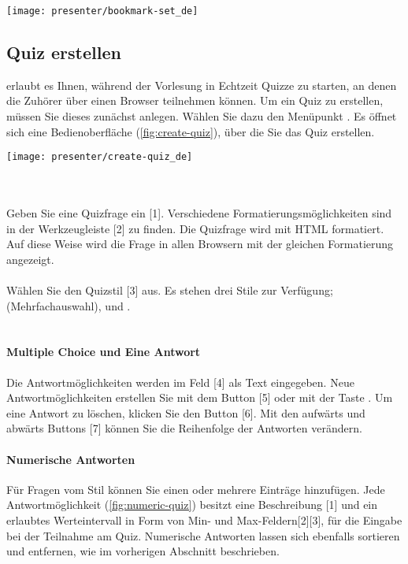 \begin{minipage}{0.9\textwidth}
	\centering
	\captionsetup{type=figure}
	\texttt{[image: presenter/bookmark-set\_de]}
  	\label{fig:bookmark-set}
\end{minipage}


\subsection{Quiz erstellen}
\label{section:create-quiz}
\lectPresenter{} erlaubt es Ihnen, während der Vorlesung in Echtzeit Quizze zu starten, an denen die Zuhörer über einen Browser teilnehmen können. Um ein Quiz zu erstellen, müssen Sie dieses zunächst anlegen. Wählen Sie dazu den Menüpunkt . Es öffnet sich eine Bedienoberfläche (\autoref{fig:create-quiz}), über die Sie das Quiz erstellen.

\begin{minipage}{0.9\textwidth}
	\centering
	\captionsetup{type=figure}
	\texttt{[image: presenter/create-quiz\_de]}
  	\label{fig:create-quiz}
\end{minipage}
\\\\
Geben Sie eine Quizfrage ein [1]. Verschiedene Formatierungsmöglichkeiten sind in der Werkzeugleiste [2] zu finden. Die Quizfrage wird mit HTML formatiert. Auf diese Weise wird die Frage in allen Browsern mit der gleichen Formatierung angezeigt.
\\\\
Wählen Sie den Quizstil [3] aus. Es stehen drei Stile zur Verfügung;  (Mehrfachauswahl),  und .
\\\\
\paragraph{Multiple Choice und Eine Antwort}
Die Antwortmöglichkeiten werden im Feld [4] als Text eingegeben. Neue Antwortmöglichkeiten erstellen Sie mit dem Button [5] oder mit der Taste . Um eine Antwort zu löschen, klicken Sie den \menu[,]{$\times$} Button [6]. Mit den aufwärts und abwärts Buttons [7] können Sie die Reihenfolge der Antworten verändern.

\paragraph{Numerische Antworten}
Für Fragen vom Stil  können Sie einen oder mehrere Einträge hinzufügen. Jede Antwortmöglichkeit (\autoref{fig:numeric-quiz}) besitzt eine Beschreibung [1] und ein erlaubtes Werteintervall in Form von Min- und Max-Feldern[2][3], für die Eingabe bei der Teilnahme am Quiz. Numerische Antworten lassen sich ebenfalls sortieren und entfernen, wie im vorherigen Abschnitt beschrieben.

